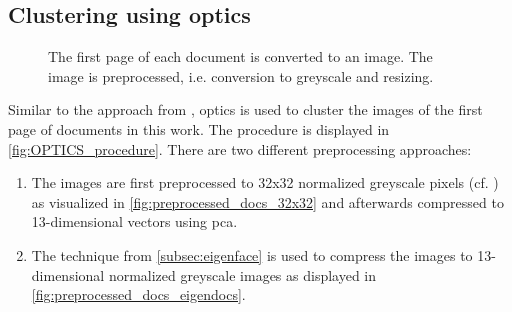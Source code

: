 \subsection{Clustering using \acs*{optics}}\label{subsec:impl-optics}

\begin{figure}[!htb] %
    \centering
    
    \caption[\ac{optics} procedure]{The first page of each document is converted to an image.
    The image is preprocessed, i.e. conversion to greyscale and resizing.
    }
    \label{fig:OPTICS_procedure}
\end{figure}

Similar to the approach from \citeauthor{OPTICS1999}, \ac{optics} is used to cluster the images of the first page of documents in this work.
The procedure is displayed in \autoref{fig:OPTICS_procedure}.
There are two different preprocessing approaches:
\begin{enumerate}
    \item \label{pt:32}The images are first preprocessed to 32x32 normalized greyscale pixels (cf. \cite{OPTICS1999}) 
    as visualized in \autoref{fig:preprocessed_docs_32x32}
    and afterwards compressed to 13-dimensional vectors using \ac{pca}.
    \item \label{pt:eigendocs}The technique \eigendocs{} from \autoref{subsec:eigenface} 
    is used to compress the images to 13-dimensional normalized greyscale images as displayed in \autoref{fig:preprocessed_docs_eigendocs}.
\end{enumerate}


